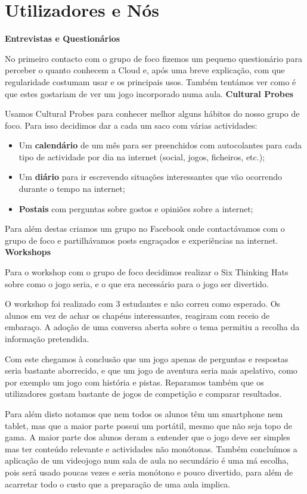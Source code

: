 \chapter{Utilizadores e Nós}
\label{chap:users} 
%
\textbf{Entrevistas e Questionários}

No primeiro contacto com o grupo de foco fizemos um pequeno questionário para perceber o quanto conhecem a Cloud e, após uma breve explicação, com que regularidade costumam usar e os principais usos. Também tentámos ver como é que estes gostariam de ver um jogo incorporado numa aula. 
\newline
\textbf{Cultural Probes}

Usamos Cultural Probes para conhecer melhor alguns hábitos do nosso grupo de foco. Para isso decidimos dar a cada um saco com várias actividades: 
\begin{itemize}
\item Um \textbf{calendário} de um mês para ser preenchidos com autocolantes para cada tipo de actividade por dia na internet (social, jogos, ficheiros, etc.);
\item Um \textbf{diário} para ir escrevendo situações interessantes que vão ocorrendo durante o tempo na internet;
\item \textbf{Postais} com perguntas sobre gostos e opiniões sobre a internet;
\end{itemize}
Para além destas criamos um grupo no Facebook onde contactávamos com o grupo de foco e partilhávamos posts engraçados e experiências na internet.
\newline
\textbf{Workshops}

Para o workshop com o grupo de foco decidimos realizar o Six Thinking Hats sobre como o jogo seria, e o que era necessário para o jogo ser divertido.

O workshop foi realizado com 3 estudantes e não correu como esperado. Os alunos em vez de achar os chapéus interessantes, reagiram com receio de embaraço. A adoção de uma conversa aberta sobre o tema permitiu a recolha da informação pretendida.

Com este chegamos à conclusão que um jogo apenas de perguntas e respostas seria bastante aborrecido, e que um jogo de aventura seria mais apelativo, como por exemplo um jogo com história e pistas. Reparamos também que os utilizadores gostam bastante de jogos de competição e comparar resultados.

Para além disto notamos que nem todos os alunos têm um smartphone nem tablet, mas que a maior parte possui um portátil, mesmo que não seja topo de gama.
A maior parte dos alunos deram a entender que o jogo deve ser simples mas ter conteúdo relevante e actividades não monótonas. Também concluímos a aplicação de um videojogo num sala de aula no secundário é uma má escolha, pois será usado poucas vezes e seria monótono e pouco divertido, para além de acarretar todo o custo que a preparação de uma aula implica.
